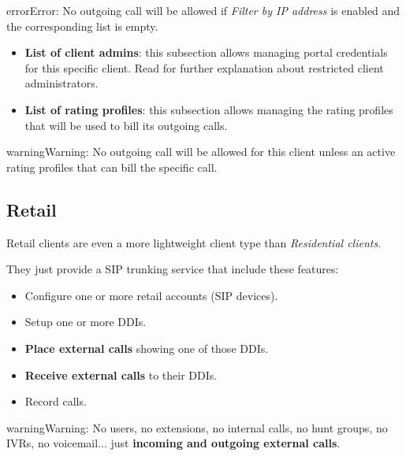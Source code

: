 \documentclass[letterpaper,10pt,english]{sphinxmanual}
\begin{document}
\begin{notice}{error}{Error:}
No outgoing call will be allowed if \emph{Filter by IP address} is enabled and the corresponding list is empty.
\end{notice}
\begin{itemize}
\item {} 
\textbf{List of client admins}: this subsection allows managing portal credentials for this specific client. Read {\hyperref[api_rest/acls:acls]{}}
for further explanation about restricted client administrators.

\item {} 
\textbf{List of rating profiles}: this subsection allows managing the rating profiles that will be used to bill its outgoing calls.

\end{itemize}

\begin{notice}{warning}{Warning:}
No outgoing call will be allowed for this client unless an active rating profiles that can
bill the specific call.
\end{notice}


\subsection{Retail}
\label{administration_portal/brand/clients/retail:retail-clients}\label{administration_portal/brand/clients/retail:retail}\label{administration_portal/brand/clients/retail::doc}
Retail clients are even a more lightweight client type than \emph{Residential clients}.

They just provide a SIP trunking service that include these features:
\begin{itemize}
\item {} 
Configure one or more retail accounts (SIP devices).

\item {} 
Setup one or more DDIs.

\item {} 
\textbf{Place external calls} showing one of those DDIs.

\item {} 
\textbf{Receive external calls} to their DDIs.

\item {} 
Record calls.

\end{itemize}

\begin{notice}{warning}{Warning:}
No users, no extensions, no internal calls, no hunt groups, no IVRs, no voicemail...
just \textbf{incoming and outgoing external calls}.
\end{notice}
\end{document}
